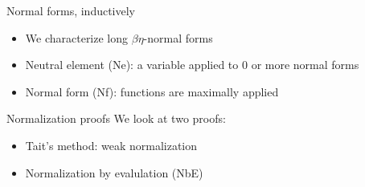 \documentclass{beamer}
\begin{document}
\begin{comment}
\begin{frame}{Normal forms and neutral terms}
\begin{itemize}
    \item<1-> We characterize \textit{long} $\beta\eta$-normal forms
    \begin{itemize}
        \item Functions are maximally applied
    \end{itemize}
    \item<2-> Normal form: $\lamv{x_1}{\sigma_1}{\ldots \lamv{x_k}{\sigma_k}{\app{\app{\app{x}{n_1}}{\ldots}}{n_l}}}$, where $\typedvar{x}{\functy{\tau_1}{\functy{\ldots}{\functy{\tau_l}{\beta}}}}$
    \[ \lamv{z}{\beta}{\app{\app{x}{y}}{z}},\text{ where } \typedvar{x}{\functy{\beta}{\functy{\beta}{\beta}}} \]
    \item<3-> Neutral term: a variable applied to 0 or more normal forms
    \[ x, \quad \app{x}{(\lamv{y}{\beta}{y})} \]
\end{itemize}
\end{frame}
\end{comment}

\begin{frame}{Normal forms, inductively}
\begin{itemize}
    \item We characterize long $\beta\eta$-normal forms
    \item Neutral element (Ne): a variable applied to 0 or more normal forms
    \item Normal form (Nf): functions are maximally applied
\end{itemize}
\begin{figure}
\end{figure}
\end{frame}

\begin{frame}{Normalization proofs}
We look at two proofs:
\begin{itemize}
    \item Tait's method: weak normalization
    \item Normalization by evalulation (NbE)
\end{itemize}
\end{frame}
\end{document}
